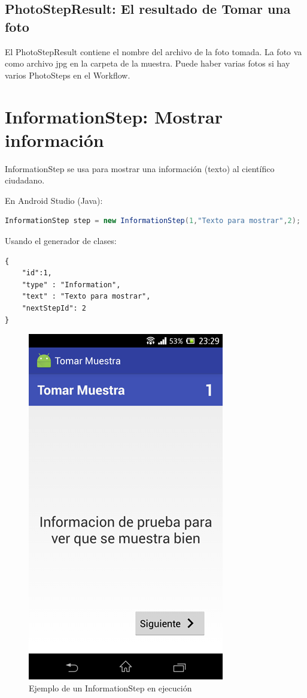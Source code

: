 \subsection{PhotoStepResult: El resultado de Tomar una foto}
El PhotoStepResult contiene el nombre del archivo de la foto tomada. La foto va como archivo jpg en la carpeta de la muestra.
Puede haber varias fotos si hay varios PhotoSteps en el Workflow.

\section{InformationStep: Mostrar información}
InformationStep se usa para mostrar una información (texto) al científico ciudadano. 

En Android Studio (Java):
\begin{lstlisting}[language=Java, frame=tlb]	
InformationStep step = new InformationStep(1,"Texto para mostrar",2);
\end{lstlisting}

Usando el generador de clases:
\begin{lstlisting}[language=XML, frame=tlb]	
{
	"id":1,
	"type" : "Information",
	"text" : "Texto para mostrar",
	"nextStepId": 2
}
\end{lstlisting}

\begin{figure}[H]
  \centering
    \includegraphics[scale=0.4]{05-implementacion/InformationStep.png} 
   \caption{Ejemplo de un InformationStep en ejecución}
   \label{fig:imgInformationStep}
\end{figure}

